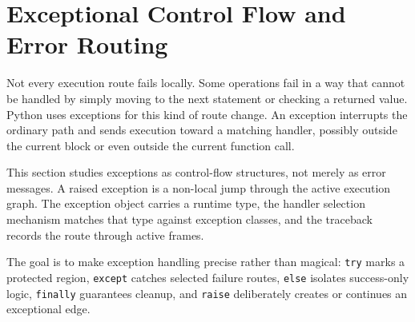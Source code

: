 \section{Exceptional Control Flow and Error Routing}

Not every execution route fails locally. Some operations fail in a way that cannot be handled by simply moving to the next statement or checking a returned value. Python uses exceptions for this kind of route change. An exception interrupts the ordinary path and sends execution toward a matching handler, possibly outside the current block or even outside the current function call.

This section studies exceptions as control-flow structures, not merely as error messages. A raised exception is a non-local jump through the active execution graph. The exception object carries a runtime type, the handler selection mechanism matches that type against exception classes, and the traceback records the route through active frames.

The goal is to make exception handling precise rather than magical: \texttt{try} marks a protected region, \texttt{except} catches selected failure routes, \texttt{else} isolates success-only logic, \texttt{finally} guarantees cleanup, and \texttt{raise} deliberately creates or continues an exceptional edge.